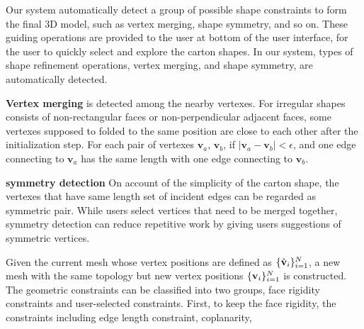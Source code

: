Our system  automatically detect a group of possible shape constraints to form the final 3D model, such as vertex merging, shape symmetry, and so on. 
%
These guiding operations are provided to the user at bottom of the user interface, for the user to quickly select and explore the carton shapes.
In our system,  types of shape refinement operations, vertex merging, and shape symmetry, are automatically detected.

%

\noindent
\textbf{Vertex merging} is detected among the nearby vertexes. 
For irregular shapes consists of non-rectangular faces or non-perpendicular adjacent faces, some vertexes supposed to folded to the same position are close to each other after the initialization step. 
For each pair of vertexes $\mathbf{v}_a$, $\mathbf{v}_b$, if $|\mathbf{v}_a-\mathbf{v}_b|<\epsilon$, and one edge connecting to $\mathbf{v}_a$ has the same length with one edge connecting to $\mathbf{v}_b$.


\noindent
\textbf{symmetry detection} On account of the simplicity of the carton shape, the vertexes that have same length set of incident edges can be regarded as symmetric pair. While users select vertices that need to be merged together, symmetry detection can reduce repetitive work by giving users suggestions of symmetric vertices.



Given the current mesh whose vertex positions are defined as $\{\hat{\mathbf{v}}_i\}^{N}_{i=1}$, a new mesh with the same topology but new vertex positions $\{\mathbf{v}_i\}^{N}_{i=1}$ is constructed.
%
The geometric constraints can be classified into two groups, face rigidity constraints and user-selected constraints. 
First, to keep the face rigidity, the constraints including edge length constraint, coplanarity, 


